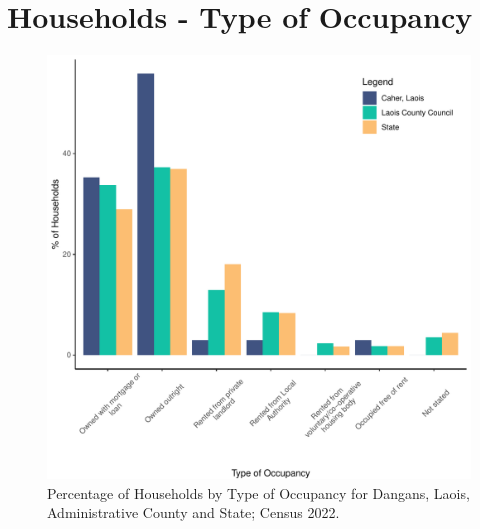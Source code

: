\documentclass{article}
\begin{document}
\section{Households - Type of Occupancy}\label{sect:Households}
\begin{figure}[H]
	\centering
	\includegraphics[width = 140mm]{../figures/HouseholdsED.pdf}
	\caption{Percentage of Households by Type of Occupancy for Dangans, Laois, Administrative County and State; Census 2022.}
	\label{fig:vbnv}
	\end{figure}
\end{document}
